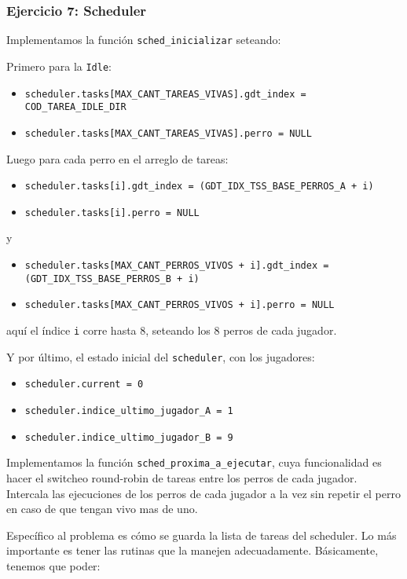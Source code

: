 \documentclass[twocolumn,10pt]{article}
\begin{document}
\subsubsection{Ejercicio 7: Scheduler}

Implementamos la función \texttt{sched\_inicializar} seteando:

Primero para la \texttt{Idle}:
\begin{itemize}
\item \texttt{scheduler.tasks[MAX\_CANT\_TAREAS\_VIVAS].gdt\_index =
    COD\_TAREA\_IDLE\_DIR}
\item \texttt{scheduler.tasks[MAX\_CANT\_TAREAS\_VIVAS].perro = NULL}
\end{itemize}

Luego para cada perro en el arreglo de tareas: 

\begin{itemize}
\item \texttt{scheduler.tasks[i].gdt\_index =
  (GDT\_IDX\_TSS\_BASE\_PERROS\_A + i)}
\item \texttt{scheduler.tasks[i].perro = NULL}
\end{itemize}
y
\begin{itemize}
\item \texttt{scheduler.tasks[MAX\_CANT\_PERROS\_VIVOS + i].gdt\_index =
  (GDT\_IDX\_TSS\_BASE\_PERROS\_B + i)}
\item \texttt{scheduler.tasks[MAX\_CANT\_PERROS\_VIVOS + i].perro = NULL}
\end{itemize}

aquí el índice \texttt{i} corre hasta 8, seteando los 8 perros de cada
jugador.

Y por último, el estado inicial del \texttt{scheduler}, con los
jugadores:

\begin{itemize}
\item \texttt{scheduler.current = 0}
\item \texttt{scheduler.indice\_ultimo\_jugador\_A = 1}
\item \texttt{scheduler.indice\_ultimo\_jugador\_B = 9}
\end{itemize}


Implementamos la función \texttt{sched\_proxima\_a\_ejecutar}, cuya
funcionalidad es hacer el switcheo round-robin de tareas entre los
perros de cada jugador. Intercala las ejecuciones de los perros de
cada jugador a la vez sin repetir el perro en caso de que tengan vivo
mas de uno.

Específico al problema es cómo se guarda la lista de tareas del
scheduler. Lo más importante es tener las rutinas que la manejen
adecuadamente. Básicamente, tenemos que poder:
\end{document}
